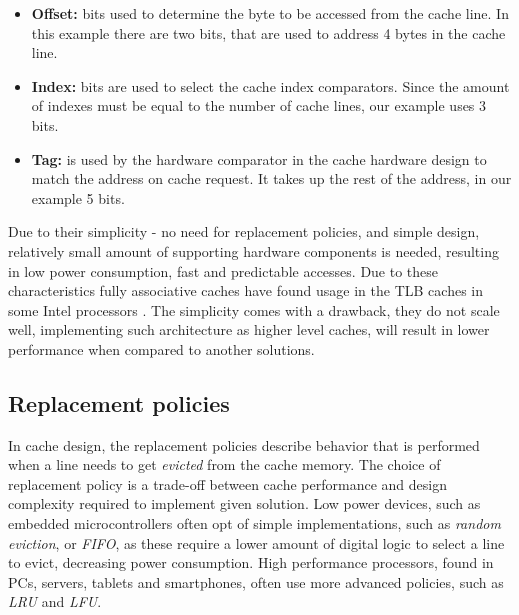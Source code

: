 \begin{itemize}
	\item \textbf{Offset:} bits used to determine the byte to be accessed from the cache line. In this example there are two bits, that are used to address 4 bytes in the cache line.
	\item \textbf{Index:}  bits are used to select the cache index comparators. Since the amount of indexes must be equal to the number of cache lines, our example uses 3 bits.
	\item \textbf{Tag:} is used by the hardware comparator in the cache hardware design to match the address on cache request. It takes up the rest of the address, in our example 5 bits.
\end{itemize}

\noindent Due to their simplicity - no need for replacement policies, and simple design, relatively small amount of supporting hardware components is needed, resulting in low power %
consumption, fast and predictable accesses. Due to these characteristics fully associative caches have found usage in the TLB caches in some Intel processors \cite{whatevery}. The simplicity
comes with a drawback, they do not scale well, implementing such architecture as higher level caches, will result in lower performance when compared to another solutions. %


%
\subsection{Replacement policies} \label{sec:eviction_policies}
In cache design, the replacement policies describe behavior that is performed when a line needs to get \textit{evicted} from the cache memory.
The choice of replacement policy is a trade-off between cache performance and design complexity required to implement given solution. Low power
devices, such as embedded microcontrollers often opt of simple implementations, such as \textit{random eviction}, or \textit{FIFO}, as these require %
a lower amount of digital logic to select a line to evict, decreasing power consumption. High performance processors, found in PCs, servers, tablets and smartphones,
often use more advanced policies, such as \textit{LRU} and \textit{LFU}.

